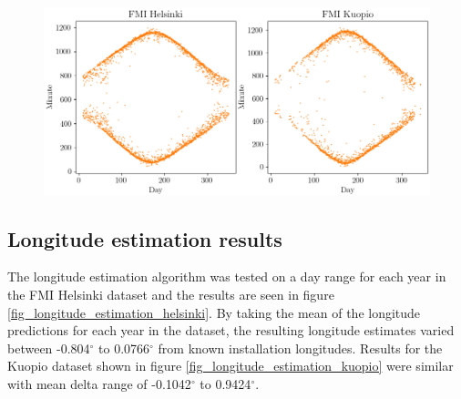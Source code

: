 


\begin{figure}[ht!]
\centering
\includegraphics[width=0.9\linewidth]{pics/first_last_helsinki_kuopio2}
\label{fig_first_last_kuopio_helsinki}
\end{figure}

\clearpage

\subsection{Longitude estimation results}
The longitude estimation algorithm was tested on a day range for each year in the FMI Helsinki dataset and the results are seen in figure \ref{fig_longitude_estimation_helsinki}. By taking the mean of the longitude predictions for each year in the dataset, the resulting longitude estimates varied between -0.804$^\circ$ to 0.0766$^\circ$ from known installation longitudes. Results for the Kuopio dataset shown in figure \ref{fig_longitude_estimation_kuopio} were similar with mean delta range of -0.1042$^\circ$ to 0.9424$^\circ$.


